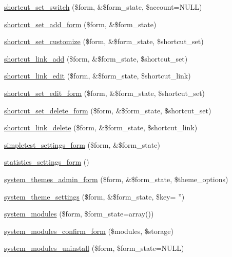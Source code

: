 \begin{DoxyCompactItemize}
\item 
\hyperlink{group__forms_ga9ec510e2dad9820993309247e6a50bd7}{shortcut\_\-set\_\-switch} (\$form, \&\$form\_\-state, \$account=NULL)
\item 
\hyperlink{group__forms_ga7c3cd4fdbb8948463aab7769fc5e07b8}{shortcut\_\-set\_\-add\_\-form} (\$form, \&\$form\_\-state)
\item 
\hyperlink{group__forms_ga6d25a8f35b26a475dc005c2cad4d902c}{shortcut\_\-set\_\-customize} (\$form, \&\$form\_\-state, \$shortcut\_\-set)
\item 
\hyperlink{group__forms_ga7d6281f92a029c89b4e72756e5f44859}{shortcut\_\-link\_\-add} (\$form, \&\$form\_\-state, \$shortcut\_\-set)
\item 
\hyperlink{group__forms_gab5cd373d268cb28d52f75cd0309da63c}{shortcut\_\-link\_\-edit} (\$form, \&\$form\_\-state, \$shortcut\_\-link)
\item 
\hyperlink{group__forms_gaaa9ef77c9928065c19fd0177ecb611b1}{shortcut\_\-set\_\-edit\_\-form} (\$form, \&\$form\_\-state, \$shortcut\_\-set)
\item 
\hyperlink{group__forms_ga7a58c99b6b77af7fe9a0c954fa63f712}{shortcut\_\-set\_\-delete\_\-form} (\$form, \&\$form\_\-state, \$shortcut\_\-set)
\item 
\hyperlink{group__forms_ga5a806d89748b578557dbc88fcf0af232}{shortcut\_\-link\_\-delete} (\$form, \&\$form\_\-state, \$shortcut\_\-link)
\item 
\hyperlink{group__forms_gaf74d9bfea1d65a5435e45a36084d10df}{simpletest\_\-settings\_\-form} (\$form, \&\$form\_\-state)
\item 
\hyperlink{group__forms_ga4b472705b18d63698ecd05ff23ef152b}{statistics\_\-settings\_\-form} ()
\item 
\hyperlink{group__forms_gad1993e041cd4138670f61859507ba9ac}{system\_\-themes\_\-admin\_\-form} (\$form, \&\$form\_\-state, \$theme\_\-options)
\item 
\hyperlink{group__forms_ga5b2e00be741c5eae4eb1e56c862a68d5}{system\_\-theme\_\-settings} (\$form, \&\$form\_\-state, \$key= '')
\item 
\hyperlink{group__forms_gaf4691243ea56e10a971d3d04a94c47b1}{system\_\-modules} (\$form, \$form\_\-state=array())
\item 
\hyperlink{group__forms_ga253f61674ab19c32b0df811c365ae00c}{system\_\-modules\_\-confirm\_\-form} (\$modules, \$storage)
\item 
\hyperlink{group__forms_gadb3d128adf18e3ff4e23ada8271b24c8}{system\_\-modules\_\-uninstall} (\$form, \$form\_\-state=NULL)

\end{DoxyCompactItemize}
